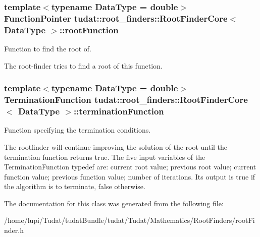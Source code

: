 \subsubsection[{\texorpdfstring{root\+Function}{rootFunction}}]{\setlength{\rightskip}{0pt plus 5cm}template$<$typename Data\+Type = double$>$ {\bf Function\+Pointer} {\bf tudat\+::root\+\_\+finders\+::\+Root\+Finder\+Core}$<$ Data\+Type $>$\+::root\+Function\hspace{0.3cm}{\ttfamily [protected]}}\hypertarget{classtudat_1_1root__finders_1_1RootFinderCore_afbe57f7fa3baba13128d9dc2ca41dedd}{}\label{classtudat_1_1root__finders_1_1RootFinderCore_afbe57f7fa3baba13128d9dc2ca41dedd}


Function to find the root of. 

The root-\/finder tries to find a root of this function. 
\subsubsection[{\texorpdfstring{termination\+Function}{terminationFunction}}]{\setlength{\rightskip}{0pt plus 5cm}template$<$typename Data\+Type = double$>$ {\bf Termination\+Function} {\bf tudat\+::root\+\_\+finders\+::\+Root\+Finder\+Core}$<$ Data\+Type $>$\+::termination\+Function\hspace{0.3cm}{\ttfamily [protected]}}\hypertarget{classtudat_1_1root__finders_1_1RootFinderCore_a7a1efe7ce979318d398b4bb8574e70d6}{}\label{classtudat_1_1root__finders_1_1RootFinderCore_a7a1efe7ce979318d398b4bb8574e70d6}


Function specifying the termination conditions. 

The rootfinder will continue improving the solution of the root until the termination function returns true. The five input variables of the Termination\+Function typedef are\+: current root value; previous root value; current function value; previous function value; number of iterations. Its output is true if the algorithm is to terminate, false otherwise. 

The documentation for this class was generated from the following file\+:\begin{DoxyCompactItemize}
\item 
/home/lupi/\+Tudat/tudat\+Bundle/tudat/\+Tudat/\+Mathematics/\+Root\+Finders/root\+Finder.\+h\end{DoxyCompactItemize}
